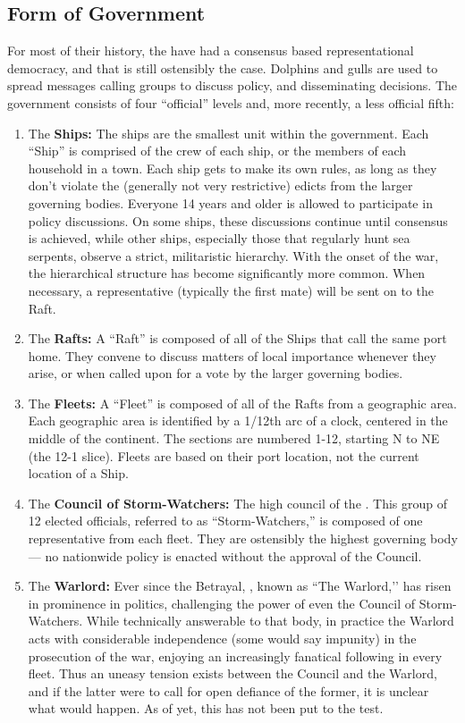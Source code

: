 \documentclass[blue]{GL2020}
\begin{document}
\subsection*{Form of Government}
For most of their history, the \pShippies{} have had a consensus based representational democracy, and that is still ostensibly the case. Dolphins and gulls are used to spread messages calling groups to discuss policy, and disseminating decisions. The government consists of four “official” levels and, more recently, a less official fifth:
\begin{enumerate}    
    \item The \textbf{Ships:} The ships are the smallest unit within the \pShip{} government. Each ``Ship'' is comprised of the crew of each ship, or the members of each household in a town. Each ship gets to make its own rules, as long as they don't violate the (generally not very restrictive) edicts from the larger governing bodies. Everyone 14 years and older is allowed to participate in policy discussions. On some ships, these discussions continue until consensus is achieved, while other ships, especially those that regularly hunt sea serpents, observe a strict, militaristic hierarchy. With the onset of the war, the hierarchical structure has become significantly more common. When necessary, a representative (typically the first mate) will be sent on to the Raft.
    \item The \textbf{Rafts:} A ``Raft'' is composed of all of the Ships that call the same port home. They convene to discuss matters of local importance whenever they arise, or when called upon for a vote by the larger governing bodies.
    \item The \textbf{Fleets:} A ``Fleet'' is composed of all of the Rafts from a geographic area. Each geographic area is identified by a 1/12th arc of a clock, centered in the middle of the continent. The sections are numbered 1-12, starting N to NE (the 12-1 slice). Fleets are based on their port location, not the current location of a Ship.
    \item The \textbf{Council of Storm-Watchers:} The high council of the \pShip{}. This group of 12 elected officials, referred to as “Storm-Watchers,” is composed of one representative from each fleet. They are ostensibly the highest governing body — no nationwide policy is enacted without the approval of the Council.
    \item The \textbf{Warlord:} Ever since the Betrayal, \cLoud{\full}, known as ``The Warlord,’’ has risen in prominence in \pShippie{} politics, challenging the power of even the Council of Storm-Watchers. While technically answerable to that body, in practice the Warlord acts with considerable independence (some would say impunity) in the prosecution of the war, enjoying an increasingly fanatical following in every fleet. Thus an uneasy tension exists between the Council and the Warlord, and if the latter were to call for open defiance of the former, it is unclear what would happen. As of yet, this has not been put to the test.
\end{enumerate}
\end{document}

